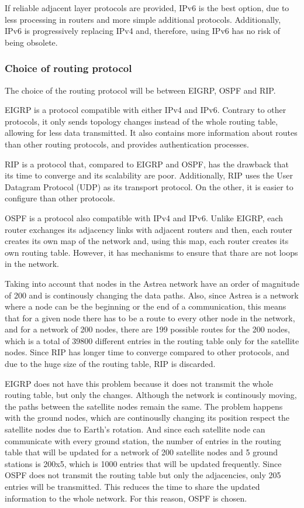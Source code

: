 If reliable adjacent layer protocols are provided, IPv6 is the best option, due to less processing in routers and more simple additional protocols. Additionally, IPv6 is progressively replacing IPv4 and, therefore, using IPv6 has no risk of being obsolete.

\subsubsection{Choice of routing protocol}
The choice of the routing protocol will be between EIGRP, OSPF and RIP.

EIGRP is a protocol compatible with either IPv4 and IPv6. Contrary to other protocols, it only sends topology changes instead of the whole routing table, allowing for less data transmitted. It also contains more information about routes than other routing protocols, and provides authentication processes.

RIP is a protocol that, compared to EIGRP and OSPF, has the drawback that its time to converge and its scalability are poor. Additionally, RIP uses the User Datagram Protocol (UDP) as its transport protocol. On the other, it is easier to configure than other protocols.

OSPF is a protocol also compatible with IPv4 and IPv6. Unlike EIGRP, each router exchanges its adjacency links with adjacent routers and then, each router creates its own map of the network and, using this map, each router creates its own routing table. However, it has mechanisms to ensure that thare are not loops in the network.

Taking into account that nodes in the Astrea network have an order of magnitude of 200 and is continously changing the data paths. Also, since Astrea is a network where a node can be the beginning or the end of a communication, this means that for a given node there has to be a route to every other node in the network, and for a network of 200 nodes, there are 199 possible routes for the 200 nodes, which is a total of 39800 different entries in the routing table only for the satellite nodes. Since RIP has longer time to converge compared to other protocols, and due to the huge size of the routing table, RIP is discarded.

EIGRP does not have this problem because it does not transmit the whole routing table, but only the changes. Although the network is continously moving, the paths between the satellite nodes remain the same. The problem happens with the ground nodes, which are continouslly changing its position respect the satellite nodes due to Earth's rotation. And since each satellite node can communicate with every ground station, the number of entries in the routing table that will be updated for a network of 200 satellite nodes and 5 ground stations is 200x5, which is 1000 entries that will be updated frequently. Since OSPF does not transmit the routing table but only the adjacencies, only 205 entries will be transmitted. This reduces the time to share the updated information to the whole network. For this reason, OSPF is chosen.

